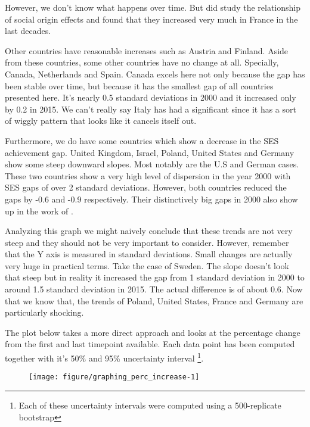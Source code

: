 \documentclass[11pt, a4paper]{article}\usepackage[]{graphicx}\usepackage[]{color}
\begin{document}
However, we don't know what happens over time. But \citet{bernardi2016} did study the relationship of social origin effects and found that they increased very much in France in the last decades.

Other countries have reasonable increases such as Austria and Finland. Aside from these countries, some other countries have no change at all. Specially, Canada, Netherlands and Spain. Canada excels here not only because the gap has been stable over time, but because it has the smallest gap of all countries presented here. It's nearly 0.5 standard deviations in 2000 and it increased only by 0.2 in 2015. We can't really say Italy has had a significant since it has a sort of wiggly pattern that looks like it cancels itself out.

Furthermore, we do have some countries which show a decrease in the SES achievement gap. United Kingdom, Israel, Poland, United States and Germany show some steep downward slopes. Most notably are the U.S and German cases. These two countries show a very high level of dispersion in the year 2000 with SES gaps of over 2 standard deviations. However, both countries reduced the gaps by -0.6 and -0.9 respectively. Their distinctively big gaps in 2000 also show up in the work of \citet{micklewright}.

Analyzing this graph we might naively conclude that these trends are not very steep and they should not be very important to consider. However, remember that the Y axis is measured in standard deviations. Small changes are actually very huge in practical terms. Take the case of Sweden. The slope doesn't look that steep but in reality it increased the gap from 1 standard deviation in 2000 to around 1.5 standard deviation in 2015. The actual difference is of about 0.6. Now that we know that, the trends of Poland, United States, France and Germany are particularly shocking.

The plot below takes a more direct approach and looks at the percentage change from the first and last timepoint available. Each data point has been computed together with it's 50\% and 95\% uncertainty interval \footnote{Each of these uncertainty intervals were computed using a 500-replicate bootstrap}.



\begin{figure}
\begin{center}


{\centering \texttt{[image: figure/graphing\_perc\_increase-1]} 

}



\end{center}
\end{figure}
\end{document}
